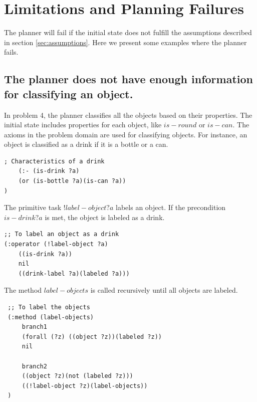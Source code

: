 \documentclass[paper=a4, fontsize=11pt]{scrartcl}
\begin{document}
	\newpage

	\section{Limitations and Planning Failures} \label{sec:limitations}
	
	The planner will fail if the initial state does not fulfill the assumptions described in section \ref{sec:assumptions}. Here we present some examples where the planner fails.
	
	\subsection{The planner does not have enough information for classifying an object.}
	
	
	In problem 4, the planner classifies all the objects based on their properties. The initial state includes properties for each object, like $is-round$ or $is-can$. The axioms in the problem domain are used for classifying objects. For instance, an object is classified as a drink if it is a bottle or a can. \\
	
	\begin{lstlisting}
; Characteristics of a drink
	(:- (is-drink ?a)
	(or (is-bottle ?a)(is-can ?a))
)
	\end{lstlisting}
	
	\vspace{5mm}
	
	The primitive task $!label-object ?a$ labels an object. If the precondition $is-drink ?a$ is met, the object is labeled as a drink. \\
	
	\begin{lstlisting}
;; To label an object as a drink
(:operator (!label-object ?a)
	((is-drink ?a))
	nil
	((drink-label ?a)(labeled ?a)))
	\end{lstlisting}
	
	\vspace{5mm}
	
	The method $label-objects$ is called recursively until all objects are labeled. \\
	
	\begin{lstlisting}
 ;; To label the objects
 (:method (label-objects)
	 branch1
	 (forall (?z) ((object ?z))(labeled ?z))
	 nil
	 
	 branch2
	 ((object ?z)(not (labeled ?z)))
	 ((!label-object ?z)(label-objects))
 )
	\end{lstlisting}
	
\end{document}
